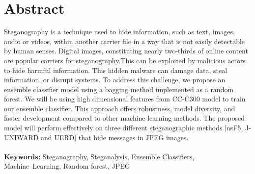 \chapter*{Abstract} 
\thispagestyle{plain}
\setcounter{page}{1}
\sloppy
Steganography is a technique used to hide information, such as text, images, audio or videos, within another carrier file in a way that is not easily detectable by human senses. Digital images, constituting nearly two-thirds of online content are popular carriers for steganography.This can be exploited by malicious actors to hide harmful information. This hidden malware can damage data, steal information, or disrupt systems. To address this challenge, we propose an ensemble classifier model using a bagging method implemented as a random forest. We will be using high dimensional features from CC-C300 model to train our ensemble classifier. This approach offers robustness, model diversity, and faster development compared to other machine learning methods. The proposed model will perform effectively on three different steganographic methods [nsF5, J-UNIWARD and UERD]  that hide messages in JPEG images.\\ \\
\normalsize{\textbf{Keywords:} Steganography, Steganalysis, Ensemble Classifiers, \mbox{Machine Learning}, Random forest, JPEG }


